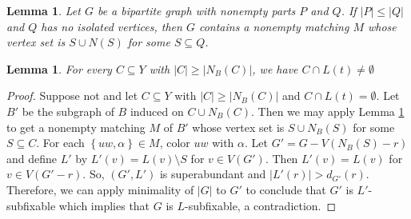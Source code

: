 \documentclass[12pt]{article}
\theoremstyle{plain}
\newtheorem{lem}[thm]{Lemma}
\theoremstyle{definition}
\theoremstyle{remark}
\newcommand{\set}[1]{\left\{ #1 \right\}}
\newcommand{\card}[1]{\left|#1\right|}
\begin{document}
		
		\begin{lem}\label{SpannerSpecial}
			Let $G$ be a bipartite graph with nonempty parts $P$ and $Q$.  If $|P| \le |Q|$ and $Q$ has no isolated vertices, then $G$ contains a nonempty matching $M$ whose vertex set is $S \cup N(S)$ for some $S \subseteq Q$.
		\end{lem}
		
	\begin{lem}\label{TameEnoughColorsHits-t}
		For every $C \subseteq Y$ with $\card{C} \ge \card{N_B(C)}$, we have $C \cap L(t) \ne \emptyset$
	\end{lem}
	\begin{proof}
			Suppose not and let $C \subseteq Y$ with $\card{C} \ge \card{N_B(C)}$ and $C \cap L(t) = \emptyset$. Let $B'$ be the subgraph of $B$ induced on $C \cup N_B(C)$. Then we may apply Lemma \ref{SpannerSpecial} to get a nonempty matching $M$ of $B'$ whose vertex set is $S \cup N_B(S)$ for some $S \subseteq C$.  For each $\set{uw, \alpha} \in M$, color $uw$ with $\alpha$.   Let $G' = G - V(N_B(S) - r)$ and define $L'$ by $L'(v) = L(v) \setminus S$ for $v \in V(G')$.  Then $L'(v) = L(v)$ for $v \in V(G'-r)$. So, $(G', L')$ is superabundant and $|L'(r)| > d_{G'}(r)$.  Therefore, we can apply minimality of $|G|$ to $G'$ to conclude that $G'$ is $L'$-subfixable which implies that $G$ is $L$-subfixable, a contradiction.			
	\end{proof}
	
\end{document}
